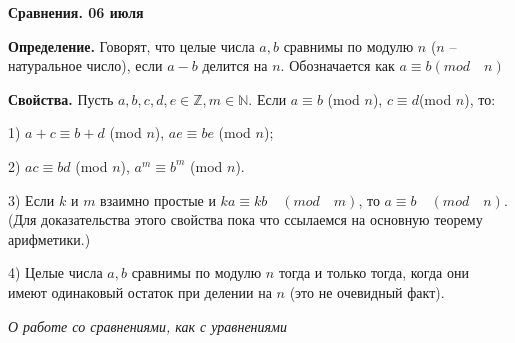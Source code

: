\begin{center}
\Large
\textbf{Сравнения. 06 июля}
\end{center}

{\bf Определение.} Говорят, что целые числа $a,b$ сравнимы по модулю $n$ ($n$ -- натуральное число), если $a-b$ делится на $n$. Обозначается как $a\equiv b (mod \quad n)$

{\bf Свойства. } Пусть $a, b, c, d, e \in \mathbb{Z}, m \in \mathbb{N}$. Если $a \equiv b$ (mod $n$), $c \equiv d$(mod $n$), то:

1) $a+c\equiv b+d$ (mod $n$), $ae\equiv be$ (mod $n$);

2) $ac\equiv bd$ (mod $n$), $a^{m}\equiv b^{m}$ (mod $n$).

3) Если $k$ и $m$ взаимно простые и $ka \equiv kb \quad (mod \quad m)$, то $a \equiv b \quad (mod \quad n)$. (Для доказательства этого свойства пока что ссылаемся на основную теорему арифметики.)

4) Целые числа $a,b$ сравнимы по модулю $n$ тогда и только тогда, когда они имеют одинаковый остаток при делении на $n$ (это не очевидный факт).


\bigskip

{\it О работе со сравнениями, как с уравнениями}

\bigskip


